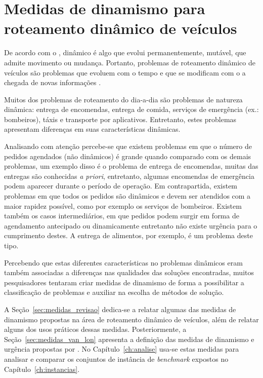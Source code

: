 \chapter{Medidas de dinamismo para roteamento dinâmico de veículos}
\label{ch:medidas}



De acordo com o \textcite{michaelis_dinamico_2019}, dinâmico é algo que evolui
permanentemente, mutável, que admite movimento ou mudança.
Portanto, problemas de roteamento dinâmico de veículos são problemas que 
evoluem com o tempo e que se modificam com o a chegada de novas informações 
\cite{psaraftis_dynamic_2015}.

Muitos dos problemas de roteamento do dia-a-dia são problemas de natureza
dinâmica: entrega de encomendas, entrega de comida, serviços de emergência
(ex.: bombeiros), táxis e transporte por aplicativos. 
Entretanto, estes problemas apresentam diferenças em suas características 
dinâmicas. 

Analisando com atenção percebe-se que existem problemas em que o número de
pedidos agendados (não dinâmicos) é grande quando comparado com os demais
problemas, um exemplo disso é o problema de entrega de encomendas, muitas das
entregas são conhecidas \textit{a priori}, entretanto, algumas encomendas de
emergência podem aparecer durante o período de operação.
Em contrapartida, existem problemas em que todos os pedidos são dinâmicos e
devem ser atendidos com a maior rapidez possível, como por exemplo os serviços
de bombeiros.
Existem também os casos intermediários, em que pedidos podem surgir em forma de
agendamento antecipado ou dinamicamente entretanto não existe urgência para o
cumprimento destes.
A entrega de alimentos, por exemplo, é um problema deste tipo.

Percebendo que estas diferentes características no problemas dinâmicos eram 
também associadas a diferenças nas qualidades das soluções encontradas,
muitos pesquisadores tentaram criar medidas de dinamismo de forma a 
possibilitar a classificação de problemas e auxiliar na escolha de métodos de 
solução.

A Seção~\ref{sec:medidas_revisao} dedica-se a relatar algumas das medidas de
dinamismo propostas na área de roteamento dinâmico de veículos,
além de relatar alguns dos usos práticos dessas medidas. 
Posteriormente, a Seção~\ref{sec:medidas_van_lon} apresenta a definição das
medidas de dinamismo e urgência propostas por \textcite{van_lon_measures_2016}.
No Capítulo~\ref{ch:analise} usa-se estas medidas para analisar
e comparar os conjuntos de instância de \textit{benchmark} expostos no 
Capítulo~\ref{ch:instancias}.








